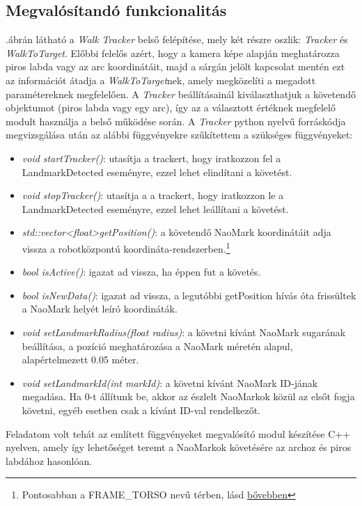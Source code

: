\documentclass{article}
\numberwithin{figure}{section}
\newcommand{\Figref}[1]{\Aref{fig:#1}.ábr}
\newenvironment{compactlist}
{ \begin{itemize}
    \setlength{\itemsep}{0pt}
    \setlength{\parskip}{0pt}
    \setlength{\parsep}{0pt}
	\setlength{\topsep}{0pt}
}
{ \end{itemize}}
\begin{document}
\begin{sloppypar}
		\subsection{Megvalósítandó funkcionalitás}
		\Figref{walktracker}án látható a \textit{Walk Tracker} belső felépítése, mely két részre oszlik: \textit{Tracker} és \textit{WalkToTarget}. Előbbi felelős azért, hogy a kamera képe alapján meghatározza piros labda vagy az arc koordinátáit, majd a sárgán jelölt kapcsolat mentén ezt az információt átadja a \textit{WalkToTarget}nek, amely megközelíti a megadott paramétereknek megfelelően. A \textit{Tracker} beállításainál kiválaszthatjuk a követendő objektumot (piros labda vagy egy arc), így az a választott értéknek megfelelő modult használja a belső működése során. A \textit{Tracker} python nyelvű forráskódja megvizsgálása után az alábbi függvényekre szűkítettem a szükséges függvényeket:
		\begin{compactlist}
			\item \textit{void startTracker()}: utasítja a trackert, hogy iratkozzon fel a LandmarkDetected eseményre, ezzel lehet elindítani a követést.
			\item \textit{void stopTracker()}: utasítja a a trackert, hogy iratkozzon le a LandmarkDetected eseményre, ezzel lehet leállítani a követést.
			\item \textit{std::vector\textless float\textgreater getPosition()}: a követendő NaoMark koordinátáit adja vissza a robotközpontú koordináta-rendszerben.\footnote{Pontosabban a FRAME\_TORSO nevű térben, lásd \href{http://doc.aldebaran.com/1-14/naoqi/motion/control-cartesian.html?highlight=frame_torso}{bővebben}}
			\item \textit{bool isActive()}: igazat ad vissza, ha éppen fut a követés.
			\item \textit{bool isNewData()}: igazat ad vissza, a legutóbbi getPosition hívás óta frissültek a NaoMark helyét leíró koordináták.
			\item \textit{void setLandmarkRadius(float radius)}: a követni kívánt NaoMark sugarának beállítása, a pozíció meghatározása a NaoMark méretén alapul, alapértelmezett 0.05 méter.
			\item \textit{void setLandmarkId(int markId)}: a követni kívánt NaoMark ID-jának megadása. Ha 0-t állítunk be, akkor az észlelt NaoMarkok közül az elsőt fogja követni, egyéb esetben csak a kívánt ID-val rendelkezőt.
		\end{compactlist}
		Feladatom volt tehát az említett függvényeket megvalósító modul készítése C++ nyelven, amely így lehetőséget teremt a NaoMarkok követésére az archoz és piros labdához hasonlóan.
		

\end{sloppypar}
\end{document}
